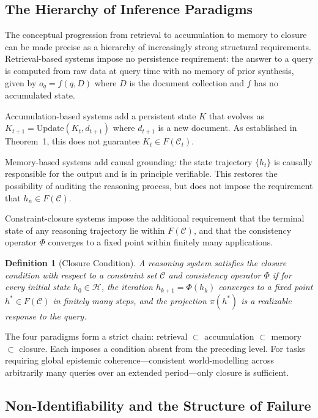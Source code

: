 \documentclass[12pt, oneside]{article}
\newtheorem{definition}{Definition}
\begin{document}
\subsection{The Hierarchy of Inference Paradigms}

The conceptual progression from retrieval to accumulation to memory to closure can be made precise as a hierarchy of increasingly strong structural requirements. Retrieval-based systems impose no persistence requirement: the answer to a query is computed from raw data at query time with no memory of prior synthesis, given by $o_q = f(q, D)$ where $D$ is the document collection and $f$ has no accumulated state.

Accumulation-based systems add a persistent state $K$ that evolves as $K_{t+1} = \text{Update}(K_t, d_{t+1})$ where $d_{t+1}$ is a new document. As established in Theorem~1, this does not guarantee $K_t \in F(\mathcal{C}_t)$.

Memory-based systems add causal grounding: the state trajectory $\{h_t\}$ is causally responsible for the output and is in principle verifiable. This restores the possibility of auditing the reasoning process, but does not impose the requirement that $h_n \in F(\mathcal{C})$.

Constraint-closure systems impose the additional requirement that the terminal state of any reasoning trajectory lie within $F(\mathcal{C})$, and that the consistency operator $\Phi$ converges to a fixed point within finitely many applications.

\begin{definition}[Closure Condition]
A reasoning system satisfies the closure condition with respect to a constraint set $\mathcal{C}$ and consistency operator $\Phi$ if for every initial state $h_0 \in \mathcal{H}$, the iteration $h_{k+1} = \Phi(h_k)$ converges to a fixed point $h^* \in F(\mathcal{C})$ in finitely many steps, and the projection $\pi(h^*)$ is a realizable response to the query.
\end{definition}

The four paradigms form a strict chain: retrieval $\subset$ accumulation $\subset$ memory $\subset$ closure. Each imposes a condition absent from the preceding level. For tasks requiring global epistemic coherence---consistent world-modelling across arbitrarily many queries over an extended period---only closure is sufficient.

\subsection{Non-Identifiability and the Structure of Failure}
\end{document}
